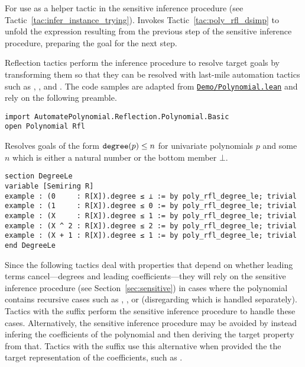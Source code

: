 \begin{tactic}
\label{tac:poly_infer_try}
\leanok
{}
For use as a helper tactic in the sensitive inference procedure (see Tactic~\ref{tac:infer_instance_trying}). Invokes Tactic~\ref{tac:poly_rfl_dsimp} to unfold the expression resulting from the previous step of the sensitive inference procedure, preparing the goal for the next step.
\end{tactic}


Reflection tactics perform the inference procedure to resolve target goals by transforming them so that they can be resolved with last-mile automation tactics such as , , and . The code samples are adapted from \href{https://github.com/LiamSchilling/AutomatePolynomial/tree/master/AutomatePolynomial/Demo/Polynomial.lean}{\texttt{Demo/Polynomial.lean}} and rely on the following preamble.

\begin{lstlisting}
import AutomatePolynomial.Reflection.Polynomial.Basic
open Polynomial Rfl
\end{lstlisting}

\begin{tactic}
\label{tac:poly_rfl_degree_le}
\leanok
{}
Resolves goals of the form $\mathtt{degree}(p) \leq n$ for univariate polynomials $p$ and some $n$ which is either a natural number or the bottom member $\bot$.
\begin{lstlisting}
section DegreeLe
variable [Semiring R]
example : (0     : R[X]).degree ≤ ⊥ := by poly_rfl_degree_le; trivial
example : (1     : R[X]).degree ≤ 0 := by poly_rfl_degree_le; trivial
example : (X     : R[X]).degree ≤ 1 := by poly_rfl_degree_le; trivial
example : (X ^ 2 : R[X]).degree ≤ 2 := by poly_rfl_degree_le; trivial
example : (X + 1 : R[X]).degree ≤ 1 := by poly_rfl_degree_le; trivial
end DegreeLe
\end{lstlisting}
\end{tactic}

Since the following tactics deal with properties that depend on whether leading terms cancel---degrees and leading coefficients---they will rely on the sensitive inference procedure (see Section~\ref{sec:sensitive}) in cases where the polynomial contains recursive cases such as \leaninline{+}, \leaninline{*}, or \leaninline{\^{}} (disregarding  which is handled separately). Tactics with the suffix  perform the sensitive inference procedure to handle these cases. Alternatively, the sensitive inference procedure may be avoided by instead infering the coefficients of the polynomial and then deriving the target property from that. Tactics with the suffix  use this alternative when provided the the target representation of the coefficients, such as .

